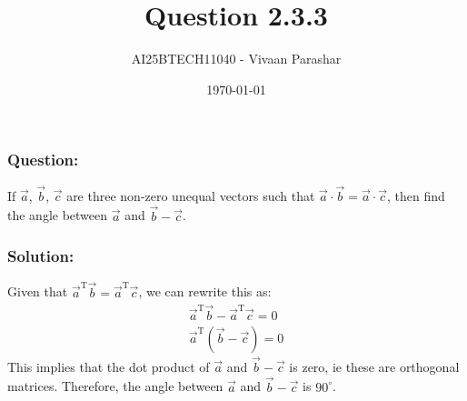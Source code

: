 \documentclass{beamer}
\title{Question 2.3.3}
\author{AI25BTECH11040 - Vivaan Parashar}
\date{\today}
\begin{document}
\frame{\titlepage}

\begin{frame}
    \frametitle{Question: }
    If $\vec{a}$, $\vec{b}$, $\vec{c}$ are three non-zero unequal vectors such that $\vec{a}\cdot\vec{b} = \vec{a}\cdot\vec{c}$, then find the angle between $\vec{a}$ and $\vec{b}-\vec{c}$.
\end{frame}

\begin{frame}
    \frametitle{Solution: }
    Given that $\vec{a}^{\mathrm{T}}\vec{b} = \vec{a}^{\mathrm{T}}\vec{c}$, we can rewrite this as:
\begin{align}
    \vec{a}^{\mathrm{T}}\vec{b} - \vec{a}^{\mathrm{T}}\vec{c} = 0 \\
    \vec{a}^{\mathrm{T}}(\vec{b} - \vec{c}) = 0
\end{align}
This implies that the dot product of $\vec{a}$ and $\vec{b} - \vec{c}$ is zero, ie these are orthogonal matrices.
Therefore, the angle between $\vec{a}$ and $\vec{b} - \vec{c}$ is $90^\circ$.
\end{frame}
\end{document}
